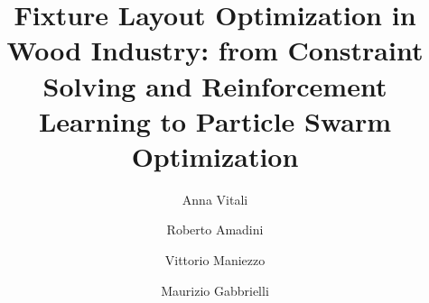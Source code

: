 \documentclass[3p,times]{elsarticle}
\begin{document}
\begin{frontmatter}



\dochead{}

\title{Fixture Layout Optimization in Wood Industry: from Constraint Solving and Reinforcement Learning to Particle Swarm Optimization}

\author[label1]{Anna Vitali}

\author[label1]{Roberto Amadini}

\author[label1]{Vittorio Maniezzo}

\author[label1]{Maurizio Gabbrielli}

\address[label1]{Department of Computer Science and Engineering, University of Bologna, Bologna, Italy}

\author{}

\address{}


\end{frontmatter}
\end{document}
